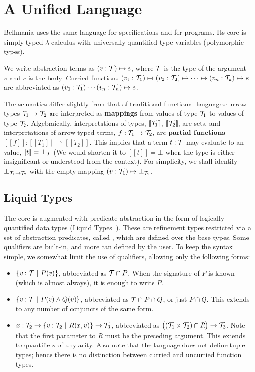 \section{A Unified Language}

\newcommand\semp[1]{[\![{#1}]\!]}
\newcommand\fix{\operatorname{fix}}

Bellmania uses the same language for specifications and for programs.  Its core is simply-typed
$\lambda$-calculus with universally quantified type variables (polymorphic types).

We write abstraction terms as $(v:\mathcal{T})\mapsto e$, where $\mathcal{T}$ is the type of the argument $v$ and $e$ is
the body. Curried functions $(v_1:\mathcal{T}_1)\mapsto (v_2:\mathcal{T}_2) \mapsto \cdots \mapsto (v_n:\mathcal{T}_n) \mapsto e$ are abbreviated 
as $(v_1:\mathcal{T}_1)\cdots(v_n:\mathcal{T}_n)\mapsto e$.

The semantics differ slightly from that of traditional functional languages: arrow types $\mathcal{T}_1\to\mathcal{T}_2$
are interpreted as {\bf mappings} from values of type $\mathcal{T}_1$ to values of type $\mathcal{T}_2$. Algebraically,
interpretations of types, $\semp{\T_1}$, $\semp{\T_2}$, are sets, and interpretations of arrow-typed terms,
$f : \mathcal{T}_1\to\mathcal{T}_2$, are {\bf partial functions} --- $\semp{f} : \semp{T_1}\rightharpoonup\semp{T_2}$.
This implies that a term $t : \mathcal{T}$ may evaluate to an  value, $\semp{t}=\bot_\T$
(We would shorten it to $\semp{t}=\bot$ when the type is either insignificant or understood from the context).
For simplicity, we shall identify $\bot_{\mathcal{T}_1\to\mathcal{T}_2}$ with the empty mapping $(v:\mathcal{T}_1)\mapsto\bot_{\mathcal{T}_2}$.

\subsection{Liquid Types}

The core is augmented with predicate abstraction in the form of logically quantified data types 
(Liquid Types~\citneeded{}). These are refinement types restricted via a set of abstraction predicates,
called , which are defined over the base types.
Some qualifiers are built-in, and more can defined by the user. To keep the syntax simple, we somewhat
limit the use of qualifiers, allowing only the following forms:

\begin{itemize}
  \item $\{v:\mathcal{T} ~|~ P(v)\}$, abbreviated as $\mathcal{T}\cap P$. When the signature of $P$ is known (which is
  almost always), it is enough to write $P$.
  \item $\{v:\mathcal{T} ~|~ P(v)\land Q(v)\}$, abbreviated as $\mathcal{T}\cap P\cap Q$, or just $P\cap Q$. This extends
  to any number of conjuncts of the same form.
  \item $x : \mathcal{T}_2 \to \{v:\mathcal{T}_2 ~|~ R(x,v)\} \to \mathcal{T}_3$, abbreviated as $\big((\mathcal{T}_1\times\mathcal{T}_2)\cap R\big)\to\mathcal{T}_3$.
  Note that the first parameter to $R$ must be the preceding argument. This extends to quantifiers of
  any arity. Also note that the language does not define tuple types; hence there is no distinction
  between curried and uncurried function types.
\end{itemize}


